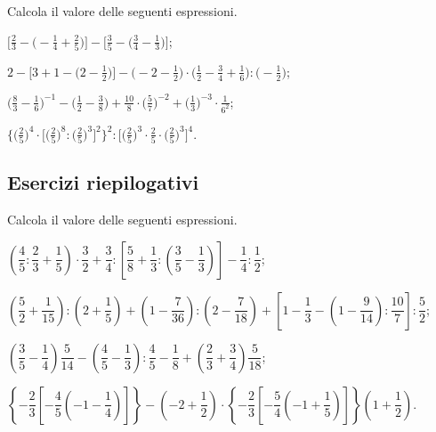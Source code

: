 \begin{esercizio}[\Ast]%
 \label{ese:3.142}
 Calcola il valore delle seguenti espressioni.
\begin{enumeratea}
\spazielenx
\item $\displaystyle{\bigg[\frac{2}{3}-\bigg(-\frac{1}{4}+\frac{2}{5}\bigg)\bigg]-\bigg[\frac{3}{5}-%
\bigg(\frac{3}{4}-\frac{1}{3}\bigg)\bigg]}$;
\item $\displaystyle{2-\bigg[3+1-\bigg(2-\frac{1}{2}\bigg)\bigg]-\bigg(-2-\frac{1}{2}\bigg)\cdot%
\bigg(\frac{1}{2}-\frac{3}{4}+\frac{1}{6}\bigg):\bigg(-{\frac{1}{2}}\bigg)}$;
\item $\displaystyle{\bigg(\frac{8}{3}-\frac{1}{6}\bigg)^{-1}-\bigg(\frac{1}{2}-\frac{3}{8}\bigg)+\frac{10}{8}\cdot%
\bigg(\frac{5}{7}\bigg)^{-2}+\bigg(\frac{1}{3}\bigg)^{-3}\cdot\frac{1}{6^{2}}}$;
\item $\displaystyle{\bigg\{\bigg(\frac{2}{5}\bigg)^{4}\cdot\bigg[\bigg(\frac{2}{5}\bigg)^{8}:%
\bigg(\frac{2}{5}\bigg)^{3}\bigg]^{2}\bigg\}^{2}:\bigg[\bigg(\frac{2}{5}\bigg)^{3}\cdot{\frac{2}{5}}\cdot%
\bigg(\frac{2}{5}\bigg)^{3}\bigg]^{4}}$.
\end{enumeratea}
\end{esercizio}

\subsection{Esercizi riepilogativi}

\begin{esercizio}[\Ast]%
 Calcola il valore delle seguenti espressioni.
\begin{enumeratea}
\spazielenx
\item $\left(\dfrac{4}{5}:\dfrac{2}{3}+\dfrac{1}{5}\right)\cdot \dfrac{3}{2}+\dfrac{3}{4}:\left[\dfrac{5}{8}+\dfrac{1}{3}:\left(\dfrac{3}{5}-\dfrac{1}{3}\right)\right]-\dfrac{1}{4}:\dfrac{1}{2}$;
\item $\left(\dfrac{5}{2}+\dfrac{1}{15}\right):\left(2+\dfrac{1}{5}\right)+\left(1-\dfrac{7}{36}\right):\left(2-\dfrac{7}{18}\right)+\left[1-\dfrac{1}{3}-\left(1-\dfrac{9}{14}\right):\dfrac{10}{7}\right]:\dfrac{5}{2}$;
\item $\left(\dfrac{3}{5}-\dfrac{1}{4}\right)\dfrac{5}{14}-\left(\dfrac{4}{5}-\dfrac{1}{3}\right):\dfrac{4}{5}-\dfrac{1}{8}+\left(\dfrac{2}{3}+\dfrac{3}{4}\right)\dfrac{5}{18}$;
\item $\left\lbrace-\dfrac{2}{3}\left[-\dfrac{4}{5}\left(-1-\dfrac{1}{4}\right)\right]\right\rbrace-\left(-2+\dfrac{1}{2}\right)\cdot\left\lbrace-\dfrac{2}{3}\left[-\dfrac{5}{4}\left(-1+\dfrac{1}{5}\right)\right]\right\rbrace\left(1+\dfrac{1}{2}\right)$.
\end{enumeratea}
\end{esercizio}

